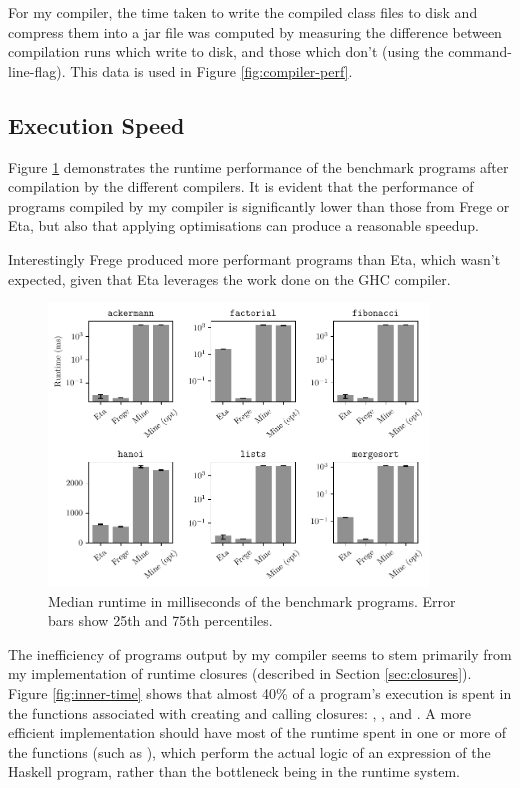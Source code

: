 \documentclass[dissertation.tex]{subfiles}
\begin{document}
{{        For my compiler, the time taken to write the compiled class files to disk and compress them into a jar file was computed by measuring the difference between compilation runs which write to disk, and those which don't (using the  command-line-flag). This data is used in Figure \ref{fig:compiler-perf}.
    }
    \subsection{Execution Speed}
    {
        Figure \ref{fig:perf} demonstrates the runtime performance of the benchmark programs after compilation by the different compilers. It is evident that the performance of programs compiled by my compiler is significantly lower than those from Frege or Eta, but also that applying optimisations can produce a reasonable speedup.

        Interestingly Frege produced more performant programs than Eta, which wasn't expected, given that Eta leverages the work done on the GHC compiler.

        \begin{figure}[h]
            \centering
            \captionsetup{width=0.8\textwidth}
            \includegraphics[width=0.9\textwidth]{graphs/perf.pdf}
            \caption{Median runtime in milliseconds of the benchmark programs. Error bars show 25th and 75th percentiles.}
            \label{fig:perf}

        \end{figure}

        The inefficiency of programs output by my compiler seems to stem primarily from my implementation of runtime closures (described in Section \ref{sec:closures}). Figure \ref{fig:inner-time} shows that almost 40\% of a program's execution is spent in the functions associated with creating and calling closures: , , and . A more efficient implementation should have most of the runtime spent in one or more of the  functions (such as ), which perform the actual logic of an expression of the Haskell program, rather than the bottleneck being in the runtime system.

}}
\end{document}

